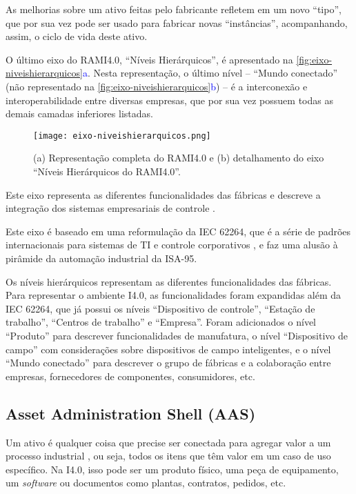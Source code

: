 As melhorias sobre um ativo feitas pelo fabricante refletem em um novo ``tipo'', que por sua vez pode ser usado para fabricar novas ``instâncias'', acompanhando, assim, o ciclo de vida deste ativo.

O último eixo do RAMI4.0, ``Níveis Hierárquicos'', é apresentado na \autoref{fig:eixo-niveishierarquicos}\textcolor{blue}{a}. Nesta representação, o último nível -- ``Mundo conectado'' (não representado na \autoref{fig:eixo-niveishierarquicos}\textcolor{blue}{b}) -- é a interconexão e interoperabilidade entre diversas empresas, que por sua vez possuem todas as demais camadas inferiores listadas.

\begin{figure}[htb]
	\centering
	\texttt{[image: eixo-niveishierarquicos.png]}
	\caption{(a) Representação completa do RAMI4.0 e (b) detalhamento do eixo ``Níveis Hierárquicos do RAMI4.0''.}
	\label{fig:eixo-niveishierarquicos}
\end{figure}

Este eixo representa as diferentes funcionalidades das fábricas e descreve a integração dos sistemas empresariais de controle \cite{pisching2018arquitetura}.

Este eixo é baseado em uma reformulação da IEC 62264, que é a série de padrões internacionais para sistemas de TI e controle corporativos \cite{hankel2015rami}, e faz uma alusão à pirâmide da automação industrial da ISA-95.

Os níveis hierárquicos representam as diferentes funcionalidades das fábricas. Para representar o ambiente I4.0, as funcionalidades foram expandidas além da IEC 62264, que já possui os níveis ``Dispositivo de controle'', ``Estação de trabalho'', ``Centros de trabalho'' e ``Empresa''. Foram adicionados o nível ``Produto'' para descrever funcionalidades de manufatura, o nível ``Dispositivo de campo'' com considerações sobre dispositivos de campo inteligentes, e o nível ``Mundo conectado'' para descrever o grupo de fábricas e a colaboração entre empresas, fornecedores de componentes, consumidores, etc.

\subsection{Asset Administration Shell (AAS)}

Um ativo é qualquer coisa que precise ser conectada para agregar valor a um processo industrial \cite{bader2019aas}, ou seja, todos os itens que têm valor em um caso de uso específico. Na I4.0, isso pode ser um produto físico, uma peça de equipamento, um \textit{software} ou documentos como plantas, contratos, pedidos, etc.

